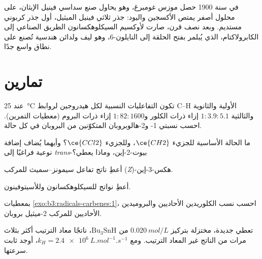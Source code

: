 \begin{history}
في سنة 1900 حصل موزس غومبرغ، وهو يحاول صنع سداسي فينيل الإيثان، على محلول أصفر
يمتص الأكسجين واليود: جذر ثلاثي فينيل الميثيل، أول
جذر كربوني مستديم. وبعد نصف قرن، صارت  لأوكسيم
السيكلوهكسانون الطريق الصناعي إلى الكابرولاكتام، الذي يُبلمر بفتح
الحلقة إلى النايلون-6، وهو ليف ولدائن هندسية تُصنع على نطاق
واسع جدًا.
\end{history}

\section{تمارين}

\begin{exercise}[$\star$]\label{exo:b3:radicals-carbenes:1}
عند \qty{25}{\celsius} تكون التفاعليات النسبية لكل هيدروجين لروابط C--H الأولية والثانوية 
والثالثية $1 : 3.9 : 5.1$ إزاء ذرات الكلور و$1 : 82 : 1600$ إزاء
ذرات البروم (معطيات التمرين). احسب نسبتي 1- و2-هالوبروبان
المتكوّنين من البروبان في كل حالة.
\end{exercise}

\begin{exercise}[$\star$]\label{exo:b3:radicals-carbenes:2}
ما الحالة الأساسية للجزيء $\ce{CH2}$، وللجزيء $\ce{CCl2}$؟ وأيهما يُضاف إضافة نوعية فراغيًا إلى
\textit{trans}-بيوت-2-إين، وماذا يعطي؟
\end{exercise}

\begin{exercise}[$\star$]\label{exo:b3:radicals-carbenes:3}
أعطِ ناتج تفاعل سيمونز--سميث للمركب (\textit{Z})-هكس-3-إين.
\end{exercise}

\begin{exercise}[$\star$]\label{exo:b3:radicals-carbenes:4}
أعطِ نواتج  للسيكلوهكسانون 
وللأسيتوفينون.
\end{exercise}

\begin{exercise}[$\star\star$]\label{exo:b3:radicals-carbenes:5}
بمعطيات \cref{exo:b3:radicals-carbenes:1}، احسب نسب
الكلوريدين الأحاديين والبروميدين الأحاديين للمركب 2-ميثيل بروبان.
\end{exercise}

\begin{exercise}[$\star\star$]\label{exo:b3:radicals-carbenes:6}
تعطي  جديدة، مختزلة بتركيز $\qty{0.020}{mol/L}$ من $\mathrm{Bu_3SnH}$، ناتجًا معاد الترتيب أكثر بثلاث مرات
من الناتج غير المعاد الترتيب. ومع $k_H = \qty{2.4e6}{L.mol^{-1}.s^{-1}}$، أوجد ثابت سرعتها.
\end{exercise}

